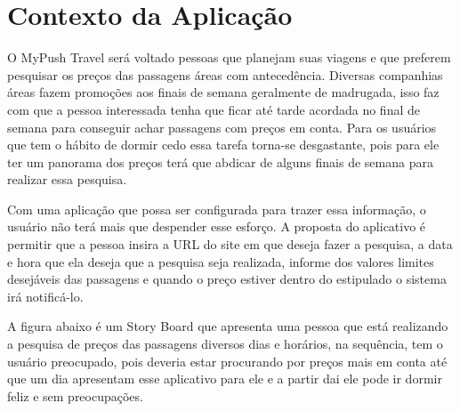 \chapter[Contexto da Aplicação]{Contexto da Aplicação}

O MyPush Travel será voltado pessoas que planejam suas viagens e que preferem pesquisar os preços das passagens áreas com antecedência. Diversas companhias áreas fazem promoções aos finais de semana geralmente de madrugada, isso faz com que a pessoa interessada tenha que ficar até tarde acordada no final de semana para conseguir achar passagens com preços em conta. Para os usuários que tem o hábito de dormir cedo essa tarefa torna-se desgastante, pois para ele ter um panorama dos preços terá que abdicar de alguns finais de semana para realizar essa pesquisa. 

Com uma aplicação que possa ser configurada para trazer essa informação, o usuário não terá mais que  despender esse esforço. A proposta do aplicativo é permitir que a pessoa insira a URL do site em que deseja fazer a pesquisa, a data e hora que ela deseja que a pesquisa seja realizada, informe dos valores limites desejáveis das passagens e quando o preço estiver dentro do estipulado o sistema irá notificá-lo. 

A figura abaixo é um Story Board que apresenta uma pessoa que está realizando a pesquisa de preços das passagens diversos  dias e horários, na sequência, tem o usuário preocupado, pois deveria estar procurando por preços mais em conta até que um dia apresentam esse aplicativo para ele e a partir dai ele pode ir dormir feliz e sem preocupações.

